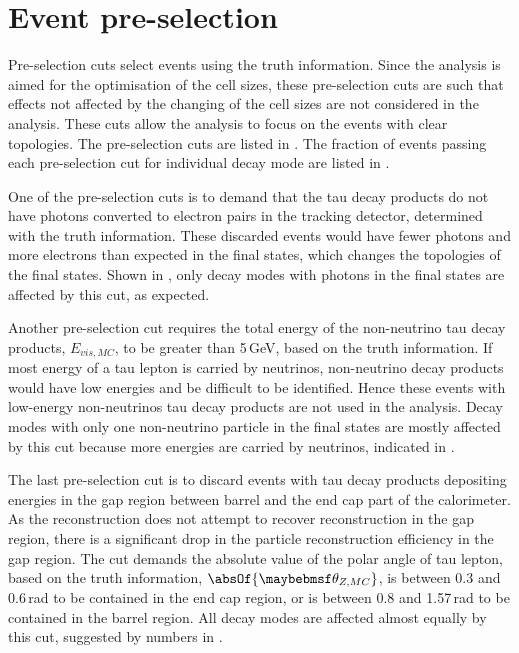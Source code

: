 \section{Event pre-selection}
\label{sec:tauPreSel}

Pre-selection cuts select events using the truth information. Since the analysis is aimed for the optimisation of the \ECAL cell sizes, these pre-selection cuts are such that effects not affected by the changing of the \ECAL cell sizes are not considered in the analysis. These cuts allow the analysis to focus on the events with clear topologies. The pre-selection cuts are listed in . The fraction of events passing each pre-selection cut for individual decay mode are listed in .

One of the pre-selection cuts is to demand that the tau decay products  do not have photons converted to electron pairs in the tracking detector, determined with the truth information. These discarded events would have fewer photons and more electrons than expected in the final states, which changes the topologies of the final states. Shown in , only decay modes with photons in the final states are affected by this cut, as expected.


Another pre-selection cut requires the total energy of the non-neutrino tau decay products, $E_{vis,MC}$, to be greater than 5\,GeV, based on the truth information. If most energy of a tau lepton is carried by  neutrinos, non-neutrino decay products would have low energies and be difficult to be identified. Hence these events with low-energy non-neutrinos tau decay products are not used in the analysis. Decay modes with only one non-neutrino particle in the final states are mostly affected by this cut because more energies are carried by neutrinos, indicated in .

The last pre-selection cut is to discard events with tau decay products depositing energies in the gap region between barrel and the end cap part of the calorimeter. As the reconstruction   does not attempt to recover reconstruction in the gap region, there is a significant drop in the particle reconstruction efficiency in the gap region. The cut demands the absolute value of the polar angle of tau lepton, based on the truth information, $\absOf{\theta_{Z,MC}}$, is between 0.3 and 0.6\,rad to be contained in the end cap region, or is between 0.8 and 1.57\,rad to be contained in the barrel region. All decay modes are affected almost equally by this cut, suggested by numbers in .



